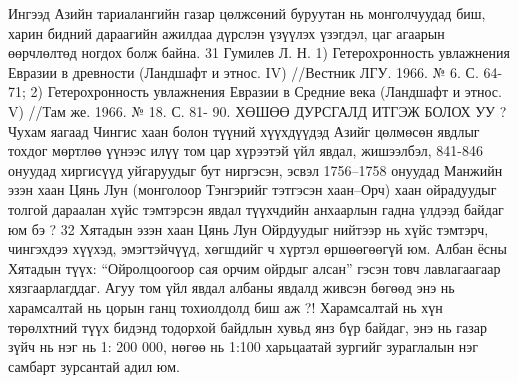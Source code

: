 Ингээд Азийн тариалангийн газар цөлжсөний буруутан нь монголчуудад биш, харин бидний дараагийн ажилдаа дүрслэн үзүүлэх үзэгдэл, цаг агаарын өөрчлөлтөд ногдох болж байна.
31 Гумилев Л. Н. 1) Гетерохронность увлажнения Евразии в древности (Ландшафт и этнос. IV) //Вестник ЛГУ. 1966. № 6. С. 64-71; 2) Гетерохронность увлажнения Евразии в Средние века (Ландшафт и этнос. V) //Там же. 1966. № 18. С. 81- 90.
ХӨШӨӨ ДУРСГАЛД ИТГЭЖ БОЛОХ УУ ?
Чухам яагаад Чингис хаан болон түүний хүүхдүүдэд Азийг цөлмөсөн явдлыг тохдог мөртлөө үүнээс илүү том цар хүрээтэй үйл явдал, жишээлбэл, 841-846 онуудад хиргисүүд уйгаруудыг бут ниргэсэн, эсвэл 1756–1758 онуудад Манжийн эзэн хаан Цянь Лун (монголоор Тэнгэрийг тэтгэсэн хаан–Орч) хаан ойрадуудыг толгой дараалан хүйс тэмтэрсэн явдал түүхчдийн анхаарлын гадна үлдээд байдаг юм бэ ?
32 Хятадын эзэн хаан Цянь Лун Ойрдуудыг нийтээр нь хүйс тэмтэрч, чингэхдээ хүүхэд, эмэгтэйчүүд, хөгшдийг ч хүртэл өршөөгөөгүй юм. Албан ёсны Хятадын түүх: “Ойролцоогоор сая орчим ойрдыг алсан” гэсэн товч лавлагаагаар хязгаарлагддаг. Агуу том үйл явдал албаны явдалд живсэн бөгөөд энэ нь харамсалтай нь цорын ганц тохиолдолд биш аж ?! Харамсалтай нь хүн төрөлхтний түүх бидэнд тодорхой байдлын хувьд янз бүр байдаг, энэ нь газар зүйч нь нэг нь 1: 200 000, нөгөө нь 1:100 харьцаатай зургийг зураглалын нэг самбарт зурсантай адил юм.

